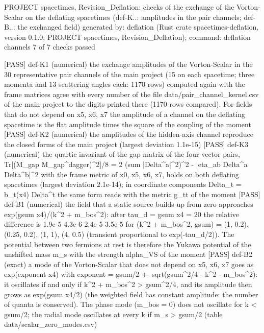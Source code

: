 \documentclass[
  10pt,
]{article}
\newenvironment{Shaded}{}{}
\newcommand{\NormalTok}[1]{#1}
\begin{document}
\begin{Shaded}
\begin{Highlighting}[]
\NormalTok{PROJECT spacetimes, Revision\_Deflation: checks of the exchange of the Vorton{-}Scalar on the deflating spacetimes (def{-}K..: amplitudes in the pair channels; def{-}B..: the exchanged field)}
\NormalTok{generated by: deflation (Rust crate spacetimes{-}deflation, version 0.1.0; PROJECT spacetimes, Revision\_Deflation); command: deflation channels}
\NormalTok{7 of 7 checks passed}

\NormalTok{[PASS] def{-}K1  (numerical) the exchange amplitudes of the Vorton{-}Scalar in the 30 representative pair channels of the main project (15 on each spacetime; three momenta and 13 scattering angles each: 1170 rows) computed again with the frame matrices agree with every number of the file data/pair\_channel\_kernel.csv of the main project to the digits printed there (1170 rows compared). For fields that do not depend on x5, x6, x7 the amplitude of a channel on the deflating spacetime is the flat amplitude times the square of the coupling of the moment}
\NormalTok{[PASS] def{-}K2  (numerical) the amplitudes of the hidden{-}axis channel reproduce the closed forms of the main project (largest deviation 1.1e{-}15)}
\NormalTok{[PASS] def{-}K3  (numerical) the quartic invariant of the gap matrix of the four vector pairs, Tr[(M\_gap M\_gap\^{}dagger)\^{}2]/8 = 2 (sum |Delta\^{}a|\^{}2)\^{}2 {-} |eta\_ab Delta\^{}a Delta\^{}b|\^{}2 with the frame metric of x0, x5, x6, x7, holds on both deflating spacetimes (largest deviation 2.1e{-}14); in coordinate components Delta\_t = b\_t(x4) Delta\^{}t the same form reads with the metric g\_tt of the moment}
\NormalTok{[PASS] def{-}B1  (numerical) the field that a static source builds up from zero approaches exp(gsum x4)/(k\^{}2 + m\_bos\^{}2): after tau\_d = gsum x4 = 20 the relative difference is 1.9e{-}5 4.3e{-}6 2.4e{-}5 3.5e{-}5 for (k\^{}2 + m\_bos\^{}2, gsum) = (1, 0.2), (0.25, 0.2), (1, 1), (4, 0.5) (transient proportional to exp({-}tau\_d/2)). The potential between two fermions at rest is therefore the Yukawa potential of the unshifted mass m\_s with the strength alpha\_VS of the moment}
\NormalTok{[PASS] def{-}B2  (exact) a mode of the Vorton{-}Scalar that does not depend on x5, x6, x7 goes as exp(exponent x4) with exponent = gsum/2 +{-} sqrt(gsum\^{}2/4 {-} k\^{}2 {-} m\_bos\^{}2): it oscillates if and only if k\^{}2 + m\_bos\^{}2 \textgreater{} gsum\^{}2/4, and its amplitude then grows as exp(gsum x4/2) (the weighted field has constant amplitude: the number of quanta is conserved). The phase mode (m\_bos = 0) does not oscillate for k \textless{} gsum/2; the radial mode oscillates at every k if m\_s \textgreater{} gsum/2 (table data/scalar\_zero\_modes.csv)}

\end{Highlighting}
\end{Shaded}
\end{document}

